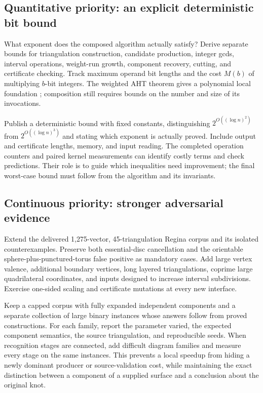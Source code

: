 \subsection{Quantitative priority: an explicit deterministic bit bound}

What exponent does the composed algorithm actually satisfy? Derive separate
bounds for triangulation construction, candidate production, integer gcds,
interval operations, weight-run growth, component recovery, cutting, and
certificate checking. Track maximum operand bit lengths and the cost
$M(b)$ of multiplying $b$-bit integers. The weighted AHT theorem gives a
polynomial local foundation \cite{AHT2006}; composition still requires bounds
on the number and size of its invocations.

Publish a deterministic bound with fixed constants, distinguishing
$2^{O((\log n)^2)}$ from $2^{O((\log n)^3)}$ and stating which exponent is
actually proved. Include output and certificate lengths, memory, and input
reading. The completed operation counters and paired kernel measurements
can identify costly terms and check predictions. Their role is to guide
which inequalities need improvement; the final worst-case bound must follow
from the algorithm and its invariants.

\subsection{Continuous priority: stronger adversarial evidence}

Extend the delivered 1,275-vector, 45-triangulation Regina corpus and its
isolated counterexamples. Preserve both essential-disc cancellation and the
orientable sphere-plus-punctured-torus false positive as mandatory cases.
Add large vertex valence, additional boundary vertices, long layered
triangulations, coprime large quadrilateral coordinates, and inputs designed
to increase interval subdivisions. Exercise one-sided scaling and certificate
mutations at every new interface.

Keep a capped corpus with fully expanded independent components and a
separate collection of large binary instances whose answers follow from
proved constructions. For each family, report the parameter varied, the
expected component semantics, the source triangulation, and reproducible
seeds. When recognition stages are connected, add difficult diagram families
and measure every stage on the same instances. This prevents a local speedup
from hiding a newly dominant producer or source-validation cost, while
maintaining the exact distinction between a component of a supplied surface
and a conclusion about the original knot.
